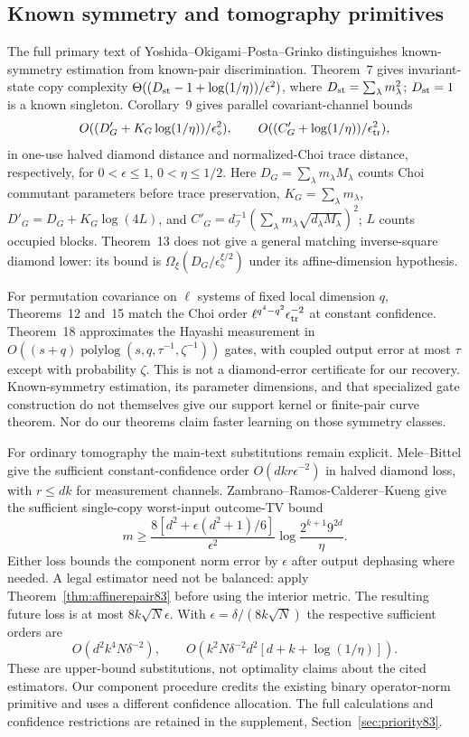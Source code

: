 \subsection{Known symmetry and tomography primitives}
The full primary text of Yoshida--Okigami--Posta--Grinko
\cite{YOPG84} distinguishes known-symmetry estimation from known-pair
discrimination.  Theorem~7 gives invariant-state copy complexity
$\Theta((D_{\rm st}-1+\log(1/\eta))/\epsilon^2)$, where
$D_{\rm st}=\sum_\lambda m_\lambda^2$; $D_{\rm st}=1$ is a
known singleton.  Corollary~9 gives parallel covariant-channel bounds
\[
 O((D'_G+K_G\log(1/\eta))/\epsilon_\diamond^2),\qquad
 O((C'_G+\log(1/\eta))/\epsilon_{\rm tr}^2),
\]
in one-use halved diamond distance and normalized-Choi trace distance,
respectively, for $0<\epsilon\le1$, $0<\eta\le1/2$.
Here $D_G=\sum_\lambda m_\lambda M_\lambda$ counts Choi commutant
parameters before trace preservation,
$K_G=\sum_\lambda m_\lambda$,
$D'_G=D_G+K_G\log(4L)$, and
$C'_G=d_{\mathcal I}^{-1}(\sum_\lambda m_\lambda
\sqrt{d_\lambda M_\lambda})^2$; $L$ counts occupied blocks.
Theorem~13 does not give a general matching inverse-square diamond
lower: its bound is $\Omega_\xi(D_G/\epsilon_\diamond^{\xi/2})$
under its affine-dimension hypothesis.

For permutation covariance on $\ell$ systems of fixed local dimension
$q$, Theorems~12 and~15 match the Choi order
$\ell^{q^4-q^2}\epsilon_{\rm tr}^{-2}$ at constant confidence.
Theorem~18 approximates the Hayashi measurement in
$O((s+q)\operatorname{polylog}(s,q,\tau^{-1},\zeta^{-1}))$ gates,
with coupled output error at most $\tau$ except with probability
$\zeta$.  This is not a diamond-error certificate for our recovery.
Known-symmetry estimation, its parameter dimensions, and that
specialized gate construction do not themselves give our support
kernel or finite-pair curve theorem.  Nor do our theorems claim
faster learning on those symmetry classes.

For ordinary tomography the main-text substitutions remain explicit.
Mele--Bittel \cite[Theorem~III.3]{MB67} give the sufficient
constant-confidence order $O(dkr\epsilon^{-2})$ in halved diamond
loss, with $r\le dk$ for measurement channels.
Zambrano--Ramos-Calderer--Kueng \cite[Theorem~2]{ZRK76} give the
sufficient single-copy worst-input outcome-TV bound
\[
 m\ge\frac{8[d^2+\epsilon(d^2+1)/6]}{\epsilon^2}
          \log\frac{2^{k+1}9^{2d}}{\eta}.
\]
Either loss bounds the component norm error by $\epsilon$ after
output dephasing where needed.  A legal estimator need not be
balanced: apply Theorem~\ref{thm:affinerepair83} before using the
interior metric.  The resulting future loss is at most
$8k\sqrt N\epsilon$.  With $\epsilon=\delta/(8k\sqrt N)$ the
respective sufficient orders are
\[
 O(d^2k^4N\delta^{-2}),\qquad
 O\!\left(k^2N\delta^{-2}d^2[d+k+\log(1/\eta)]\right).
\]
These are upper-bound substitutions, not optimality claims about
the cited estimators.  Our component procedure credits the existing
binary operator-norm primitive and uses a different confidence
allocation.  The full calculations and confidence restrictions
are retained in the supplement, Section~\ref{sec:priority83}.

